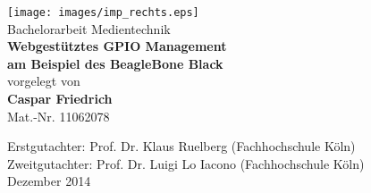 \begin{titlepage}
\begin{center}

\texttt{[image: images/imp\_rechts.eps]}\\[3cm]

Bachelorarbeit Medientechnik\\[0.5cm]
{\sffamily \bfseries \Huge Webgestütztes GPIO Management\\[0.25cm]
am Beispiel des BeagleBone Black}\\[2cm]

vorgelegt von\\[0.5cm]
\textbf{Caspar Friedrich}\\[0.5cm]
Mat.-Nr. 11062078\\[0.5cm]

\vfill

Erstgutachter: Prof. Dr. Klaus Ruelberg (Fachhochschule Köln)\\[0.5cm]
Zweitgutachter: Prof. Dr. Luigi Lo Iacono (Fachhochschule Köln)\\[0.5cm]
Dezember 2014

\end{center}
\end{titlepage}